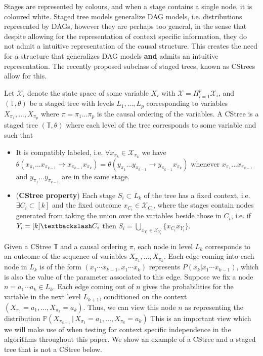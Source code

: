\documentclass{tufte-book}
\begin{document}
Stages are represented by colours, and when a stage contains a single node, it is coloured white. Staged tree models generalize DAG models, i.e. distributions represented by DAGs, however they are perhaps too general, in the sense that despite allowing for the representation of context specific information, they do not admit a intuitive representation of the causal structure. This creates the need for a structure that generalizes DAG models \textbf{and} admits an intuitive representation. The recently proposed subclass of staged trees, known as CStrees allow for this.

\begin{definition}[CStrees]\label{def:cstree}
Let $\mathcal{X}_i$ denote the state space of some variable $X_i$ with $\mathcal{X} = \Pi_{i=1}^p \mathcal{X}_i$, and $(\mathbb{T},\theta)$ be a staged tree with levels $L_1,...,L_p$ corresponding to variables $X_{\pi_1},...,X_{\pi_p}$ where $\pi = \pi_1...\pi_p$ is the causal ordering of the variables.  
A CStree is a staged tree $(\mathbb{T}, \theta)$ where each level of the tree corresponds to some variable and  such that 
\begin{itemize}
\item It is compatibly labeled, i.e. $\forall x_{\pi_k} \in \mathcal{X}_{\pi_k}$ we have $\theta(x_{\pi_1}...x_{\pi_{k-1}}\rightarrow x_{\pi_{k-1}}x_{\pi_k}) = \theta(y_{\pi_1}...y_{\pi_{k-1}}\rightarrow y_{\pi_{k-1}}x_{\pi_k})$ whenever $x_{\pi_1}...x_{\pi_{k-1}}$ and $y_{\pi_1}...y_{\pi_{k-1}}$ are in the same stage.
\item (\textbf{CStree property}) Each stage $S_i \subset L_k$ of the tree has a fixed context, i.e. $\exists C_i \subset [k]$ and the fixed outcome $x_{C_i} \in \mathcal{X}_{C_i}$, where the stages contain nodes generated from taking the union over the variables beside those in $C_i$, i.e. if $Y_i = [k] \textbackslash C_i$ then $S_i = \bigcup_{x_{Y_i} \in \mathcal{X}_{Y_i}} \{x_{C_i}x_{Y_i} \}$.
\end{itemize}
\end{definition}



Given a CStree \(\mathbb{T}\) and a causal ordering \(\pi\), each node in level \(L_k\) corresponds to an outcome of the sequence of variables \(X_{\pi_1},...,X_{\pi_k}\). Each edge coming into each node in \(L_k\) is of the form \((x_1\cdots x_{k-1},x_1\cdots x_k)\) represents \(P(x_{k}|x_1 \cdots x_{k-1})\), which is also the value of the parameter associated to this edge. Suppose we fix a node \(n = a_1\cdots a_k \in L_k\). Each edge coming out of \(n\) gives the probabilities for the variable in the next level \(L_{k+1}\), conditioned on the context \((X_{\pi_1}=a_1,...,X_{\pi_k}=a_k)\). Thus, we can view this node \(n\) as representing the distribution \(\mathbb{P}(X_{\pi_{k+1}}\,|\, X_{\pi_1}=a_1,...,X_{\pi_k}=a_k)\) This is an important view which we will make use of when testing for context specific independence in the algorithms throughout this paper. We show an example of a CStree and a staged tree that is not a CStree below.
\end{document}
